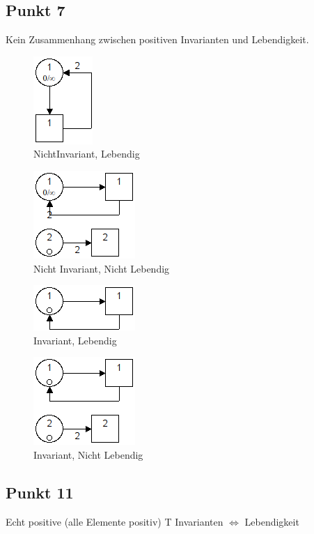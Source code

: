 \documentclass[10pt]{scrartcl}
\begin{document}
		
		\subsection{Punkt 7}
		Kein Zusammenhang zwischen positiven Invarianten und Lebendigkeit.
				\begin{figure}[H]
    				\centering	
					\includegraphics[scale=0.5]{aufg071.png}		
            		\caption{NichtInvariant, Lebendig}
				\end{figure}
				\begin{figure}[H]
    				\centering	
					\includegraphics[scale=0.5]{aufg072.png}		
            		\caption{Nicht Invariant, Nicht Lebendig}
				\end{figure}
				\begin{figure}[H]
    				\centering	
					\includegraphics[scale=0.5]{aufg073.png}		
            		\caption{Invariant, Lebendig}
				\end{figure}
				\begin{figure}[H]
    				\centering	
					\includegraphics[scale=0.5]{aufg074.png}		
            		\caption{Invariant, Nicht Lebendig}
				\end{figure}
				
		\subsection{Punkt 11}
		Echt positive (alle Elemente positiv) T Invarianten $\Longleftrightarrow$ Lebendigkeit
		
\end{document}
